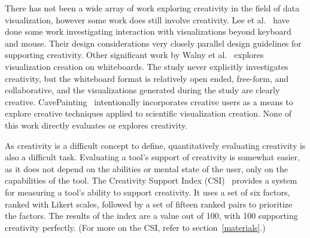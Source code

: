\label{creativitySupport}

There has not been a wide array of work exploring creativity in the field of data visualization, however some work does still involve creativity.
Lee et al.~\cite{lee2012beyond} have done some work investigating interaction with visualizations beyond keyboard and mouse.
Their design considerations very closely parallel design guidelines for supporting creativity.
Other significant work by Walny et al.~\cite{walny2011visual} explores visualization creation on whiteboards.
The study never explicitly investigates creativity, but the whiteboard format is relatively open ended, free-form, and collaborative, and the visualizations generated during the study are clearly creative.
CavePainting~\cite{Keefe-2008-SSF} intentionally incorporates creative users as a means to explore creative techniques applied to scientific visualization creation.
None of this work directly evaluates or explores creativity.

As creativity is a difficult concept to define, quantitatively evaluating creativity is also a difficult task.
Evaluating a tool's support of creativity is somewhat easier, as it does not depend on the abilities or mental state of the user, only on the capabilities of the tool.
The Creativity Support Index (CSI)~\cite{carroll2009creativity} provides a system for measuring a tool's ability to support creativity.
It uses a set of six factors, ranked with Likert scales, followed by a set of fifteen ranked pairs to prioritize the factors.
The results of the index are a value out of 100, with 100 supporting creativity perfectly.
(For more on the CSI, refer to section~\ref{materials}.)